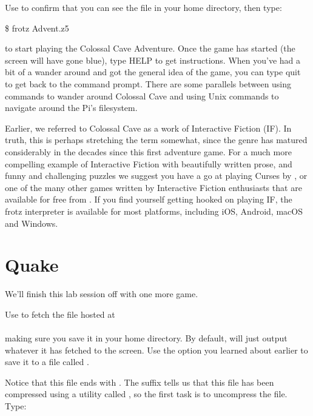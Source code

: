 Use  to confirm that you can see the file  in your home directory, then type:

\begin{ttoutenv}
\$ frotz Advent.z5
\end{ttoutenv}

\noindent to start playing the Colossal Cave Adventure. Once the game has started (the screen will have gone blue), type HELP to get instructions. When you've had a bit of a wander around and got the general idea of the game, you can type quit to get back to the command prompt. There are some parallels between using commands to wander around Colossal Cave and using Unix commands to navigate around the Pi's filesystem.

Earlier, we referred to Colossal Cave as a work of Interactive Fiction (IF). In truth, this is perhaps stretching the term somewhat, since the genre has matured considerably in the decades since this first adventure game. For a much more compelling example of Interactive Fiction with beautifully written prose, and funny and challenging puzzles we suggest you have a go at playing Curses by , or one of the many other games written by Interactive Fiction enthusiasts that are available for free from . If you find yourself getting hooked on playing IF, the frotz interpreter is available for most platforms, including iOS, Android, macOS and Windows.

\section{Quake}

We'll finish this lab session off with one more game.

Use  to fetch the file hosted at
\\
\\
making sure you save it in your home directory. By default,  will just output whatever it has fetched to the screen. Use the option you learned about earlier to save it to a file called .

Notice that this file ends with . The  suffix tells us that this file has been compressed using a utility called , so the first task is to uncompress the file. Type:

